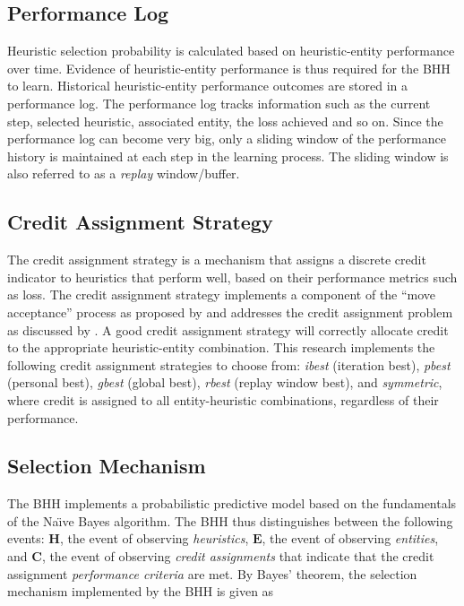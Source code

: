 \documentclass[preprint,review,12pt]{elsarticle}
\begin{document}
\subsection{Performance Log}\label{sec:bhh:performance_log}

Heuristic selection probability is calculated based on heuristic-entity performance over time. Evidence of heuristic-entity performance is thus required for the \acs{BHH} to learn. Historical heuristic-entity performance outcomes are stored in a performance log. The performance log tracks information such as the current step, selected heuristic, associated entity, the loss achieved and so on. Since the performance log can become very big, only a sliding window of the performance history is maintained at each step in the learning process. The sliding window is also referred to as a \textit{replay} window/buffer.

\subsection{Credit Assignment Strategy}
\label{sec:bhh:credit_assignment_strategy}

The credit assignment strategy is a mechanism that assigns a discrete credit indicator to heuristics that perform well, based on their performance metrics such as loss. The credit assignment strategy implements a component of the ``move acceptance'' process as proposed by \citet{ref:ozcan:2006} and addresses the credit assignment problem as discussed by \citet{ref:burke:2010}. A good credit assignment strategy will correctly allocate credit to the appropriate heuristic-entity combination. This research implements the following credit assignment strategies to choose from: \textit{ibest} (iteration best), \textit{pbest} (personal best), \textit{gbest} (global best), \textit{rbest} (replay window best), and \textit{symmetric}, where credit is assigned to all entity-heuristic combinations, regardless of their performance.

\subsection{Selection Mechanism}\label{sec:bhh:selection_mechanism}

The \acs{BHH} implements a probabilistic predictive model based on the fundamentals of the Na\"{\i}ve Bayes algorithm. The \acs{BHH} thus distinguishes between the following events: \textbf{$\boldsymbol{H}$}, the event of observing \textit{heuristics}, \textbf{$\boldsymbol{E}$}, the event of observing \textit{entities}, and \textbf{$\boldsymbol{C}$}, the event of observing \textit{credit assignments} that indicate that the credit assignment \textit{performance criteria} are met. By Bayes' theorem, the selection mechanism implemented by the \acs{BHH} is given as
\end{document}
